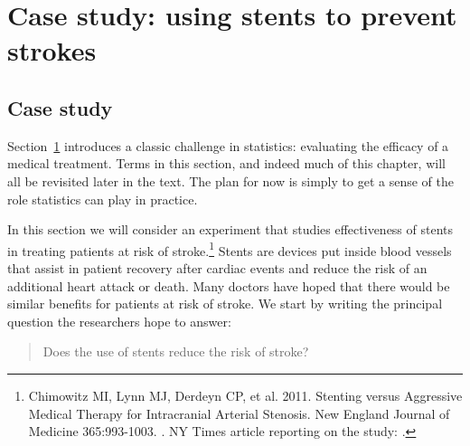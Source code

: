 \section[Case study]{Case study: using stents to prevent strokes }
\label{basicExampleOfStentsAndStrokes}

\subsection{Case study}
Section~\ref{basicExampleOfStentsAndStrokes} introduces a classic challenge in statistics: evaluating the efficacy of a medical treatment. Terms in this section, and indeed much of this chapter, will all be revisited later in the text. The plan for now is simply to get a sense of the role statistics can play in practice.

In this section we will consider an experiment that studies effectiveness of stents in treating patients at risk of stroke.\footnote{Chimowitz MI, Lynn MJ, Derdeyn CP, et al. 2011. Stenting versus Aggressive Medical Therapy for Intracranial Arterial Stenosis. New England Journal of Medicine 365:993-1003. . NY Times article reporting on the study: .} Stents are devices put inside blood vessels that assist in patient recovery after cardiac events and reduce the risk of an additional heart attack or death. Many doctors have hoped that there would be similar benefits for patients at risk of stroke. We start by writing the principal question the researchers hope to answer:
\begin{quote}
Does the use of stents reduce the risk of stroke?
\end{quote}

